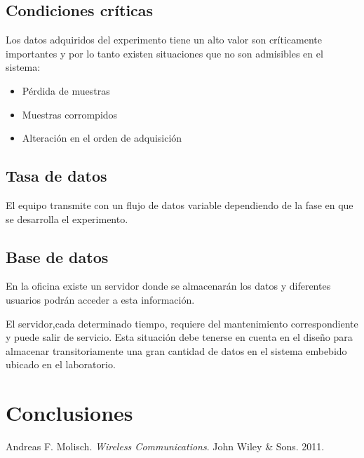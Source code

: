 \documentclass[11pt,oneside,spanish,a4paper]{article}
\begin{document}
\subsection{Condiciones críticas}
\label{sec:critical}

Los datos adquiridos del experimento  tiene un alto valor son
críticamente importantes y por lo tanto existen situaciones que no son
admisibles en el sistema:
\begin{itemize}
\item Pérdida de muestras
\item Muestras corrompidos
\item Alteración en el orden de adquisición
\end{itemize}

\subsection{Tasa de datos}
\label{sec:tasa}

El equipo transmite con un flujo de datos variable dependiendo de la
fase en que se desarrolla el experimento. 

\subsection{Base de datos}
\label{sec:db}

En la oficina existe un servidor donde se almacenarán los datos y
diferentes usuarios podrán acceder a esta información. 

El servidor,cada determinado tiempo, requiere del mantenimiento
correspondiente y puede salir de servicio. Esta situación debe tenerse
en cuenta en el diseño para almacenar transitoriamente una gran
cantidad de  datos en el sistema embebido ubicado en el
laboratorio.




\section{Conclusiones}
\label{sec:conc}


\begin{thebibliography}{1}

 Andreas F. Molisch.
\emph{Wireless Communications}.
John Wiley \& Sons. 2011.

\end{thebibliography}
\end{document}
